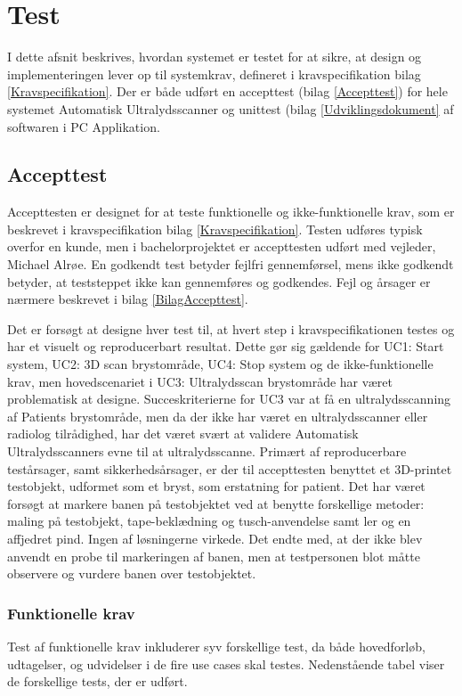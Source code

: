 \chapter{Test}\label{Test}
I dette afsnit beskrives, hvordan systemet er testet for at sikre, at design og implementeringen lever op til systemkrav, defineret i kravspecifikation bilag \ref{Kravspecifikation}. Der er både udført en accepttest (bilag \ref{Accepttest})  for hele systemet Automatisk Ultralydsscanner og unittest (bilag \ref{Udviklingsdokument} af softwaren i PC Applikation. 

\section{Accepttest}

Accepttesten er designet for at teste funktionelle og ikke-funktionelle krav, som er beskrevet i kravspecifikation bilag \ref{Kravspecifikation}. Testen udføres typisk overfor en kunde, men i bachelorprojektet er accepttesten udført med vejleder, Michael Alrøe. En godkendt test betyder fejlfri gennemførsel, mens ikke godkendt betyder, at teststeppet ikke kan gennemføres og godkendes. Fejl og årsager er nærmere beskrevet i bilag \ref{BilagAccepttest}.  

Det er forsøgt at designe hver test til, at hvert step i kravspecifikationen testes og har et visuelt og reproducerbart resultat. Dette gør sig gældende for UC1: Start system, UC2: 3D scan brystområde, UC4: Stop system og de ikke-funktionelle krav, men hovedscenariet i UC3: Ultralydsscan brystområde har været problematisk at designe. Succeskriterierne for UC3 var at få en ultralydsscanning af Patients brystområde, men da der ikke har været en ultralydsscanner eller radiolog tilrådighed, har det været svært at validere Automatisk Ultralydsscanners evne til at ultralydsscanne. Primært af reproducerbare testårsager, samt sikkerhedsårsager, er der til accepttesten benyttet et 3D-printet testobjekt, udformet som et bryst, som erstatning for patient. Det har været forsøgt at markere banen på testobjektet ved at benytte forskellige metoder: maling på testobjekt, tape-beklædning og tusch-anvendelse samt ler og en affjedret pind. Ingen af løsningerne virkede. Det endte med, at der ikke blev anvendt en probe til markeringen af banen, men at testpersonen blot måtte observere og vurdere banen over testobjektet. 
\newpage
\subsection{Funktionelle krav} 
Test af funktionelle krav inkluderer syv forskellige test, da både hovedforløb, udtagelser, og udvidelser i de fire use cases skal testes. Nedenstående tabel viser de forskellige tests, der er udført. 

